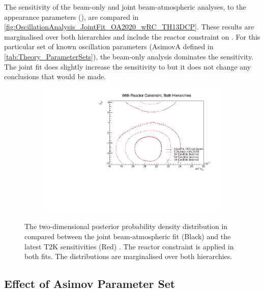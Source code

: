 The sensitivity of the beam-only and joint beam-atmospheric analyses, to the appearance parameters (), are compared in \autoref{fig:OscillationAnalysis_JointFit_OA2020_wRC_TH13DCP}. These results are marginalised over both hierarchies and include the reactor constraint on . For this particular set of known oscillation parameters (AsimovA defined in \autoref{tab:Theory_ParameterSets}), the beam-only analysis dominates the sensitivity. The joint fit does slightly increase the sensitivity to  but it does not change any conclusions that would be made.

\begin{figure}[h]
  \begin{subfigure}[t]{0.98\textwidth}
    \includegraphics[width=\textwidth, trim={0mm 0mm 0mm 0mm}, clip,page=1]{Figures/OA/JointFit_OA2020_wRC_Comp/ContourComparison_2D_th13_dcp_BH_1_wRC_UnSmeared_CredibleInterval.pdf}
  \end{subfigure}
  \caption{The two-dimensional posterior probability density distribution in  compared between the joint beam-atmospheric fit (Black) and the latest T2K sensitivities (Red) \cite{t2k_tn_399}. The reactor constraint is applied in both fits. The distributions are marginalised over both hierarchies.}
  \label{fig:OscillationAnalysis_JointFit_OA2020_wRC_TH13DCP}
\end{figure}

\clearpage
\subsection{Effect of Asimov Parameter Set}
\label{sec:OscillationAnalysis_AsimovB}

